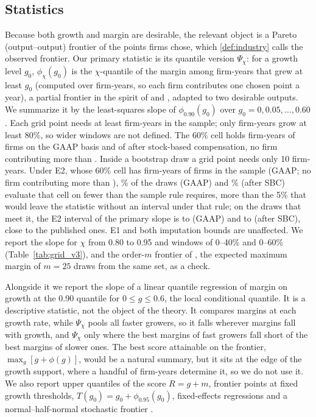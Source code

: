 \subsection{Statistics}
Because both growth and margin are desirable, the relevant object is a Pareto (output--output) frontier of the points firms chose, which \autoref{def:industry} calls the observed frontier. Our primary statistic is its quantile version $\Psi_\chi$: for a growth level $g_0$, $\phi_\chi(g_0)$ is the $\chi$-quantile of the margin among firm-years that grew at least $g_0$ (computed over firm-years, so each firm contributes one chosen point a year), a partial frontier in the spirit of \citet{aragon2005nonparametric} and \citet{daraio2007advanced}, adapted to two desirable outputs. We summarize it by the least-squares slope of $\phi_{0.90}(g_0)$ over $g_0=0,0.05,\dots,0.60$. Each grid point needs at least \BootMinCell{} firm-years in the sample; only \PsiCellsEightyEone{} firm-years grow at least 80\%, so wider windows are not defined. The 60\% cell holds \CellSixtyOpEoneN{} firm-years of \CellSixtyOpEoneFirms{} firms on the GAAP basis and \CellSixtyCashEoneN{} of \CellSixtyCashEoneFirms{} after stock-based compensation, no firm contributing more than \CellSixtyMaxEone. Inside a bootstrap draw a grid point needs only 10 firm-years. Under E2, whose 60\% cell has \DefDrawOpCell{} firm-years of \CellSixtyOpEtwoFirms{} firms in the sample (GAAP; no firm contributing more than \CellSixtyMaxEtwo), \DefDrawOpShare\% of the draws (GAAP) and \DefDrawCashShare\% (after SBC) evaluate that cell on fewer than the sample rule requires, more than the 5\% that would leave the statistic without an interval under that rule; on the draws that meet it, the E2 interval of the primary slope is \DefDrawOpLo{} to \DefDrawOpHi{} (GAAP) and \DefDrawCashLo{} to \DefDrawCashHi{} (after SBC), close to the published ones. E1 and both imputation bounds are unaffected. We report the slope for $\chi$ from 0.80 to 0.95 and windows of 0--40\% and 0--60\% (Table~\ref{tab:grid_v3}), and the order-$m$ frontier of \citet{cazals2002nonparametric}, the expected maximum margin of $m=25$ draws from the same set, as a check.

Alongside it we report the slope of a linear quantile regression \citep{koenker1978regression} of margin on growth at the 0.90 quantile for $0\leq g\leq0.6$, the local conditional quantile. It is a descriptive statistic, not the object of the theory. It compares margins at each growth rate, while $\Psi_\chi$ pools all faster growers, so it falls wherever margins fall with growth, and $\Psi_\chi$ only where the best margins of fast growers fall short of the best margins of slower ones. The best score attainable on the frontier, $\max_g[g+\phi(g)]$, would be a natural summary, but it sits at the edge of the growth support, where a handful of firm-years determine it, so we do not use it. We also report upper quantiles of the score $R=g+m$, frontier points at fixed growth thresholds, $T(g_0)=g_0+\phi_{0.95}(g_0)$, fixed-effects regressions and a normal--half-normal stochastic frontier \citep{aigner1977formulation,meeusen1977efficiency}.

